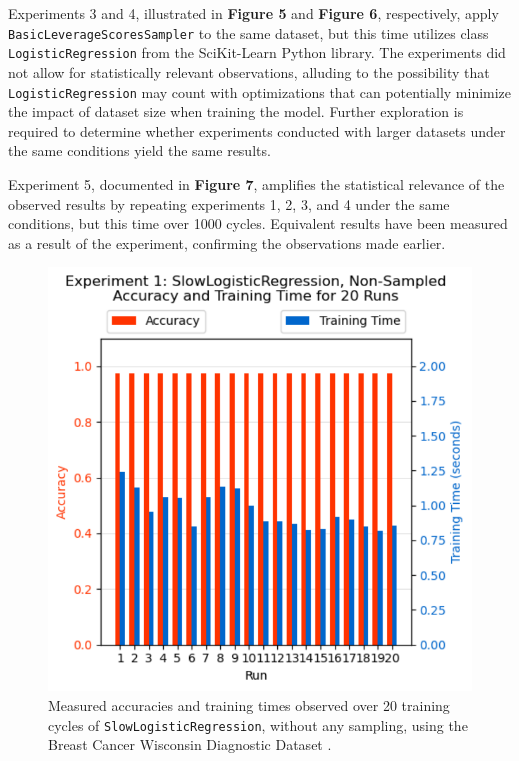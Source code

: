 \documentclass{article}
\theoremstyle{plain}
\theoremstyle{definition}
\theoremstyle{remark}
\begin{document}
Experiments 3 and 4, illustrated in \textbf{Figure 5} and \textbf{Figure 6}, respectively, apply \texttt{BasicLeverageScoresSampler} to the same dataset, but this time utilizes class \texttt{LogisticRegression} from the SciKit-Learn Python library. The experiments did not allow for statistically relevant observations, alluding to the possibility that \texttt{LogisticRegression} may count with optimizations that can potentially minimize the impact of dataset size when training the model. Further exploration is required to determine whether experiments conducted with larger datasets under the same conditions yield the same results.

Experiment 5, documented in \textbf{Figure 7}, amplifies the statistical relevance of the observed results by repeating experiments 1, 2, 3, and 4 under the same conditions, but this time over 1000 cycles. Equivalent results have been measured as a result of the experiment, confirming the observations made earlier.


\begin{figure}[ht]
\vskip 0.2in
\begin{center}
\centerline{\includegraphics[width=\columnwidth]{experiment_1a}}
\caption{Measured accuracies and training times observed over 20 training cycles of \texttt{SlowLogisticRegression}, without any sampling, using the Breast Cancer Wisconsin Diagnostic Dataset \cite{breastcancer}.}
\label{experiment_1a}
\end{center}
\vskip -0.2in
\end{figure}
\end{document}
